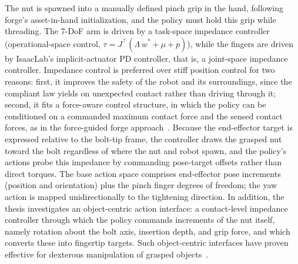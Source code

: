 \documentclass[AIRstudentexpose%
              ,optBiber%
              ,optBibstyleNumeric%
              ,optEnglish%
              ]{AIRlatex}%
\begin{document}
{The nut is spawned into a manually defined pinch grip in the hand, following forge's asset-in-hand initialization, and the policy must hold this grip while threading. The 7-DoF arm is driven by a task-space impedance controller (operational-space control, $\tau = J^{\top}(\Lambda\,\dot{w}^{*} + \mu + p)$), while the fingers are driven by IsaacLab's implicit-actuator PD controller, that is, a joint-space impedance controller. Impedance control is preferred over stiff position control for two reasons: first, it improves the safety of the robot and its surroundings, since the compliant law yields on unexpected contact rather than driving through it; second, it fits a force-aware control structure, in which the policy can be conditioned on a commanded maximum contact force and the sensed contact forces, as in the force-guided forge approach~\cite{Noseworthy2025}. Because the end-effector target is expressed relative to the bolt-tip frame, the controller draws the grasped nut toward the bolt regardless of where the nut and robot spawn, and the policy's actions probe this impedance by commanding pose-target offsets rather than direct torques. The base action space comprises end-effector pose increments (position and orientation) plus the pinch finger degrees of freedom; the yaw action is mapped unidirectionally to the tightening direction. In addition, the thesis investigates an object-centric action interface: a contact-level impedance controller through which the policy commands increments of the nut itself, namely rotation about the bolt axis, insertion depth, and grip force, and which converts these into fingertip targets. Such object-centric interfaces have proven effective for dexterous manipulation of grasped objects~\cite{Pfanne2022,Kedia2026}.%
}%
%
\subsection{}%
%
%
\end{document}
